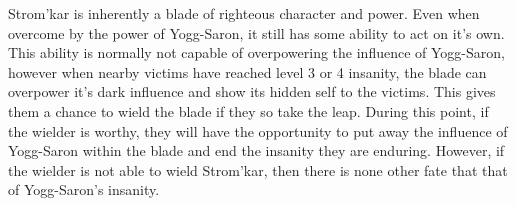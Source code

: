 Strom'kar is inherently a blade of righteous character and power. Even when overcome by the power of Yogg-Saron, it still has some ability to act on it's own. This ability is normally not capable of overpowering the influence of Yogg-Saron, however when nearby victims have reached level 3 or 4 insanity, the blade can overpower it's dark influence and show its hidden self to the victims. This gives them a chance to wield the blade if they so take the leap. During this point, if the wielder is worthy, they will have the opportunity to put away the influence of Yogg-Saron within the blade and end the insanity they are enduring. However, if the wielder is not able to wield Strom'kar, then there is none other fate that that of Yogg-Saron's insanity.